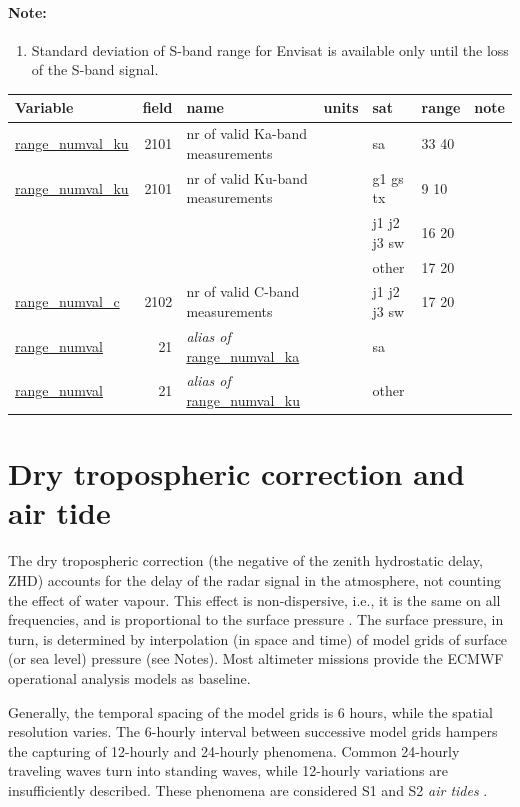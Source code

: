 \documentclass[a4paper,11pt,openany,natbib,nomargin]{thesis}
\makeatletter
\newcommand\var[1]{\url{#1}\index{variables!#1@\protect\url{#1}}}
\newcommand\alias[1]{\emph{alias of} \var{#1}}
\newenvironment{vartable}{
\begin{table}[ht]
\small
\begin{tabular}{lrllllr}
\hline
Variable & field & name & units & sat & range & note \\
\hline
}{
\hline
\end{tabular}
\end{table}
}
\newenvironment{notes}[1][Notes:]{\FloatBarrier\paragraph{#1}\begin{enumerate}}{\end{enumerate}}
\makeatother
\begin{document}
\begin{notes}[Note:]
\item Standard deviation of S-band range for Envisat is available only until the loss of the S-band signal.\label{item:range_rms_s}
\end{notes}

\begin{vartable}
\var{range_numval_ku} & 2101 & nr of valid Ka-band measurements && sa & 33 40 & \\
\var{range_numval_ku} & 2101 & nr of valid Ku-band measurements && g1 gs tx & 9 10 & \\
                      &      &                                      && j1 j2 j3 sw & 16 20 & \\
                      &      &                                      && other & 17 20 & \\
\var{range_numval_c} & 2102 & nr of valid C-band measurements && j1 j2 j3 sw & 17 20 & \\
\hline
\var{range_numval} &   21 & \alias{range_numval_ka} && sa && \\
\var{range_numval} &   21 & \alias{range_numval_ku} && other && \\
\end{vartable}

\section{Dry tropospheric correction and air tide}
\label{var:dry_tropo}
The dry tropospheric correction (the negative of the zenith hydrostatic delay, ZHD) accounts for the delay of the radar signal in the atmosphere, not counting the effect of water vapour. This effect is non-dispersive, i.e., it is the same on all frequencies, and is proportional to the surface pressure \citep{saastamoinen1972}. The surface pressure, in turn, is determined by interpolation (in space and time) of model grids of surface (or sea level) pressure (see Notes). Most altimeter missions provide the ECMWF operational analysis models as baseline.

Generally, the temporal spacing of the model grids is 6 hours, while the spatial resolution varies. The 6-hourly interval between successive model grids hampers the capturing of 12-hourly and 24-hourly phenomena. Common 24-hourly traveling waves turn into standing waves, while 12-hourly variations are insufficiently described. These phenomena are considered S1 and S2 \emph{air tides} \citep{ponte2002}.
\end{document}
